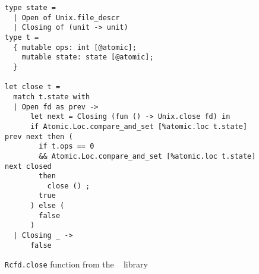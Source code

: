 \begin{figure}[tp]
\begin{verbatim}
type state =
  | Open of Unix.file_descr
  | Closing of (unit -> unit)
type t =
  { mutable ops: int [@atomic];
    mutable state: state [@atomic];
  }

let close t =
  match t.state with
  | Open fd as prev ->
      let next = Closing (fun () -> Unix.close fd) in
      if Atomic.Loc.compare_and_set [%atomic.loc t.state] prev next then (
        if t.ops == 0
        && Atomic.Loc.compare_and_set [%atomic.loc t.state] next closed
        then
          close () ;
        true
      ) else (
        false
      )
  | Closing _ ->
      false
\end{verbatim}
\caption{\texttt{Rcfd.close} function from the \Eio~\cite{eio} library}
\label{fig:rcfd}
\end{figure}



